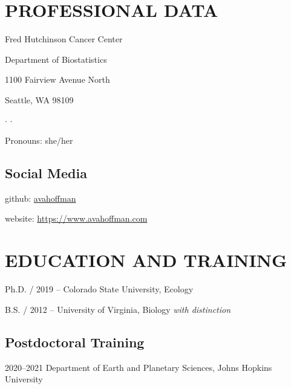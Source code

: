\documentclass{cv}
\begin{document}


\section*{PROFESSIONAL DATA}

Fred Hutchinson Cancer Center

Department of Biostatistics

1100 Fairview Avenue North

Seattle, WA 98109

 $\cdot$  $\cdot$ 

Pronouns: she/her

\subsection*{Social Media}

github: \href{https://github.com/avahoffman}{avahoffman}

website: \href{https://www.avahoffman.com}{https://www.avahoffman.com}


\section*{EDUCATION AND TRAINING}

Ph.D. / 2019 -- Colorado State University, Ecology

B.S. / 2012 -- University of Virginia, Biology \textit{with distinction}

\subsection*{Postdoctoral Training}

2020--2021 Department of Earth and Planetary Sciences,  Johns Hopkins University

\end{document}
